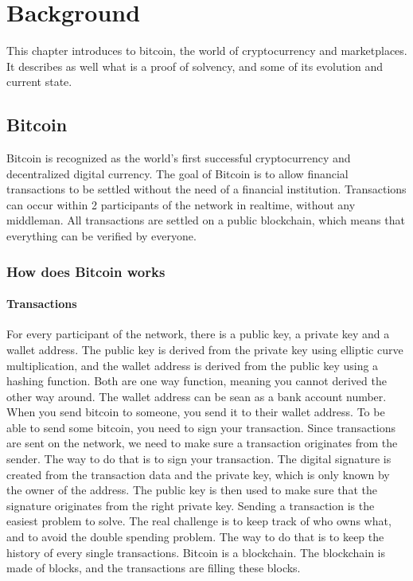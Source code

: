 
\chapter{Background}
This chapter introduces to bitcoin, the world of cryptocurrency and marketplaces. It describes as well 
what is a proof of solvency, and some of its evolution and current state.

\section{Bitcoin}

Bitcoin is recognized as the world's first successful cryptocurrency and decentralized digital currency. 
The goal of Bitcoin is to allow financial transactions to be settled without the need of a financial institution.
Transactions can occur within 2 participants of the network in realtime, without any middleman. 
All transactions are settled on a public blockchain, which means that everything can be verified by everyone. 

\subsection{How does Bitcoin works}
\subsubsection{Transactions}
For every participant of the network, there is a public key,  a private key and a wallet address.
The public key is derived from the private key using elliptic curve multiplication, and the wallet address is derived from the public key using a hashing function.
Both are one way function, meaning you cannot derived the other way around.
The wallet address can be sean as a bank account number. When you send bitcoin to someone, you send it to their wallet address.
To be able to send some bitcoin, you need to sign your transaction. 
Since transactions are sent on the network, we need to make sure a transaction originates from the sender.
The way to do that is to sign your transaction. The digital signature is created from the transaction data and the private key, which is only known by the owner of the address.
The public key is then used to make sure that the signature originates from the right private key.
Sending a transaction is the easiest problem to solve. The real challenge is to keep track of who owns what, and to avoid the double spending problem.
The way to do that is to keep the history of every single transactions. 
Bitcoin is a blockchain. The blockchain is made of blocks, and the transactions are filling these blocks.


